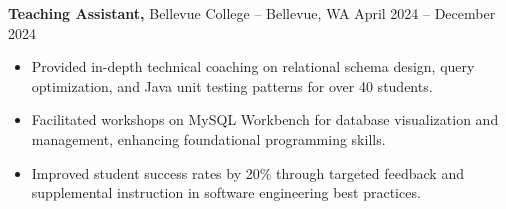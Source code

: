 \documentclass[11pt]{article}       %
\begin{document}
\textbf{Teaching Assistant,} {Bellevue College} -- Bellevue, WA \hfill April 2024 -- December 2024 \\
\vspace{-9pt}
\begin{itemize}
  \item Provided in-depth technical coaching on relational schema design, query optimization, and Java unit testing patterns for over 40 students.
  \item Facilitated workshops on MySQL Workbench for database visualization and management, enhancing foundational programming skills.
  \item Improved student success rates by 20\% through targeted feedback and supplemental instruction in software engineering best practices.
\end{itemize}

\end{document}
